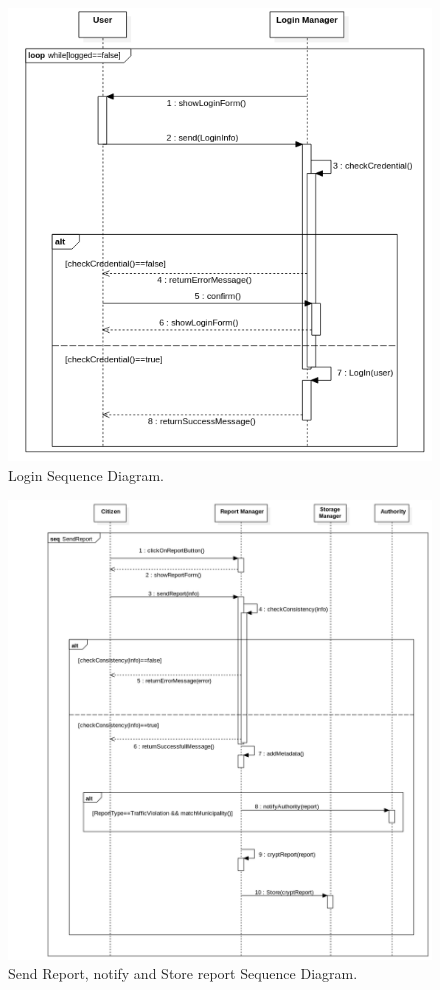 \documentclass{report}
\begin{document}
\begin{figure}[ht!]
\begin{center}
\includegraphics[width=\textwidth]{./img/LoginSD.png}
\end{center}
\caption{Login Sequence Diagram.}
\label{fig:SequenceDiagram2}
\end{figure}
\newpage
\begin{figure}[ht!]
\begin{center}
\includegraphics[width=\textwidth]{./img/SendReportSD.png}
\end{center}
\caption{Send Report, notify and Store report Sequence Diagram.}
\label{fig:SequenceDiagram3}
\end{figure}
\end{document}
